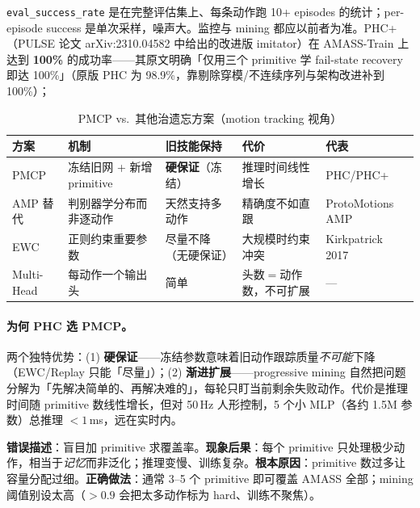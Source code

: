\begin{note}
\verb|eval_success_rate| 是在完整评估集上、每条动作跑 10+ episodes 的统计；per-episode success 是单次采样，噪声大。监控与 mining 都应以前者为准。PHC+（PULSE 论文 arXiv:2310.04582 中给出的改进版 imitator）在 AMASS-Train 上达到 \textbf{100\%} 的成功率——其原文明确「仅用三个 primitive 学 fail-state recovery 即达 100\%」（原版 PHC 为 98.9\%，靠剔除穿模/不连续序列与架构改进补到 100\%）；
\end{note}

\begin{table}[ht]
\centering
\small
\caption{PMCP vs.\ 其他治遗忘方案（motion tracking 视角）}
\label{tab:rlmc-mi-forget}
\begin{tabular}{@{}lllll@{}}
\toprule
方案 & 机制 & 旧技能保持 & 代价 & 代表 \\
\midrule
PMCP & 冻结旧网 + 新增 primitive & \textbf{硬保证}（冻结） & 推理时间线性增长 & PHC/PHC+ \\
AMP 替代 & 判别器学分布而非逐动作 & 天然支持多动作 & 精确度不如直跟 & ProtoMotions AMP \\
EWC & 正则约束重要参数 & 尽量不降（无硬保证） & 大规模时约束冲突 & Kirkpatrick 2017 \\
Multi-Head & 每动作一个输出头 & 简单 & 头数$=$动作数，不可扩展 & --- \\
\bottomrule
\end{tabular}
\end{table}

\paragraph{为何 PHC 选 PMCP。}两个独特优势：(1) \textbf{硬保证}——冻结参数意味着旧动作跟踪质量\emph{不可能}下降（EWC/Replay 只能「尽量」）；(2) \textbf{渐进扩展}——progressive mining 自然把问题分解为「先解决简单的、再解决难的」，每轮只盯当前剩余失败动作。代价是推理时间随 primitive 数线性增长，但对 50\,Hz 人形控制，5 个小 MLP（各约 1.5M 参数）总推理 $<1$\,ms，远在实时内。

\begin{pitfall}
\textbf{错误描述}：盲目加 primitive 求覆盖率。\textbf{现象后果}：每个 primitive 只处理极少动作，相当于\emph{记忆}而非泛化；推理变慢、训练复杂。\textbf{根本原因}：primitive 数过多让容量分配过细。\textbf{正确做法}：通常 3--5 个 primitive 即可覆盖 AMASS 全部；mining 阈值别设太高（$>0.9$ 会把太多动作标为 hard、训练不聚焦）。
\end{pitfall}

